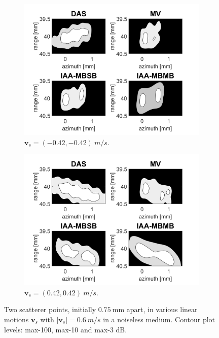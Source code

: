 \begin{figure}[ht]
\begin{subfigure}[t]{0.48\linewidth}
        \includegraphics[width=\linewidth]{./images/results/4/motion_45_-06.png}
        \caption{$\boldsymbol{v}_s = (-0.42, -0.42)~m/s$.}
        \label{fig:mla_g}
    \end{subfigure}
    \quad
    \begin{subfigure}[t]{0.48\linewidth}
        \includegraphics[width=\linewidth]{./images/results/4/motion_45_06.png}
        \caption{$\boldsymbol{v}_s = (0.42, 0.42)~m/s$.}
        \label{fig:mla_h}
    \end{subfigure}
	\caption[Two scatterer points, initially $0.75~$mm apart, in various linear motions $\boldsymbol{v}_s$ with $|\boldsymbol{v}_s|=0.6~m/s$ in a noiseless medium.]{Two scatterer points, initially $0.75~$mm apart, in various linear motions $\boldsymbol{v}_s$ with $|\boldsymbol{v}_s|=0.6~m/s$ in a noiseless medium. Contour plot levels: max-100, max-10 and max-3 dB.}
	\label{fig:two_points_linear_motion_mla}
\end{figure}